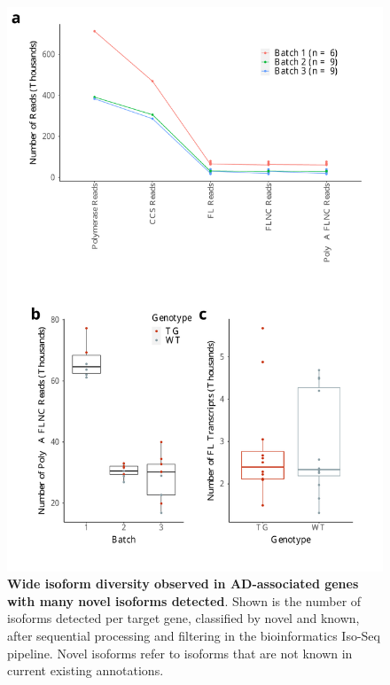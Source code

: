\begin{figure}[!htp]
	\begin{center}
		\includegraphics[page=3,scale = 0.55]{Figures/TargetedTranscriptome.pdf}
	\end{center}
	\captionsetup{width=0.95\textwidth}
	\caption[Wide isoform diversity in AD-associated genes from Targeted Sequencing in mouse cortex]%
	{\textbf{Wide isoform diversity observed in AD-associated genes with many novel isoforms detected}. Shown is the number of isoforms detected per target gene, classified by novel and known, after sequential processing and filtering in the bioinformatics Iso-Seq pipeline. Novel isoforms refer to isoforms that are not known in current existing annotations.}
	\label{fig:isoseq_targeted_finalnumberiso}
\end{figure}

